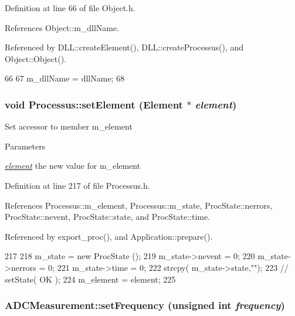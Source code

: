 Definition at line 66 of file Object.h.

References Object::m\_\-dllName.

Referenced by DLL::createElement(), DLL::createProcessus(), and Object::Object().


\begin{DoxyCode}
66                                       {
67     m_dllName = dllName;
68   }
\end{DoxyCode}
\hypertarget{classProcessus_a8ddef94227d83d9dae2cd49aebc33353}{
\subsubsection[{setElement}]{\setlength{\rightskip}{0pt plus 5cm}void Processus::setElement ({\bf Element} $\ast$ {\em element})}}
\label{classProcessus_a8ddef94227d83d9dae2cd49aebc33353}
Set accessor to member m\_\-element 
\begin{DoxyParams}{Parameters}
\item[{\em \hyperlink{namespaceelement}{element}}]the new value for m\_\-element \end{DoxyParams}


Definition at line 217 of file Processus.h.

References Processus::m\_\-element, Processus::m\_\-state, ProcState::nerrors, ProcState::nevent, ProcState::state, and ProcState::time.

Referenced by export\_\-proc(), and Application::prepare().


\begin{DoxyCode}
217                                      {
218     m_state = new ProcState ();
219     m_state->nevent  = 0;
220     m_state->nerrors = 0;
221     m_state->time    = 0;
222     strcpy( m_state->state,"");
223     //  setState( OK );
224     m_element = element;
225   }
\end{DoxyCode}
\hypertarget{classADCMeasurement_a08433e5168f45de1061bf9a17f022f68}{
\subsubsection[{setFrequency}]{ ADCMeasurement::setFrequency (unsigned int {\em frequency})}}
\label{classADCMeasurement_a08433e5168f45de1061bf9a17f022f68}


